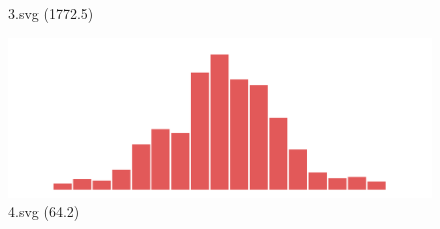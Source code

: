\documentclass[journal]{IEEEtran}
\begin{document}
\begin{figure}[!htbp]
\begin{minipage}{0.233\columnwidth}
{3.svg (1772.5)}
\end{minipage}
\hfill
\begin{minipage}{0.233\columnwidth}
\centering
\includegraphics[width=\textwidth]{Train_set/4.pdf}
{4.svg (64.2)}
\end{minipage}
\end{figure}
\end{document}
